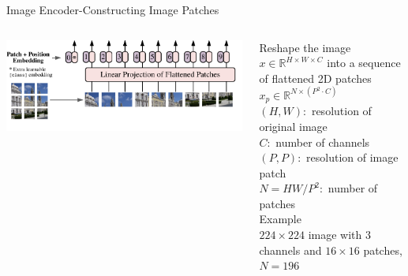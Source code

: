 \documentclass[aspectratio=169,xcolor=dvipsnames]{beamer}
\begin{document}




\begin{frame}{Image Encoder-Constructing Image Patches}

\begin{columns}
    \begin{column}{0.5\textwidth}
    \includegraphics[width=\textwidth]{figures/patches_vision_transformer.png}
    \end{column}

    \begin{column}{0.5\textwidth}
    Reshape the image $x \in \mathbb{R}^{H\times W \times C}$ into a sequence of flattened 2D patches $x_p \in \mathbb{R}^{N\times (P^2\cdot C)}$\\
    \smallskip
    $(H,W) : $ resolution of original image\\
    $C : $ number of channels\\
    $(P,P) : $ resolution of image patch\\
    $N=HW/P^2 : $ number of patches \\
    \bigskip
    Example\\
    $224\times 224$ image with $3$ channels and $16\times 16$ patches,$N=196$
\end{column}
\end{columns}

\end{frame}


\end{document}
